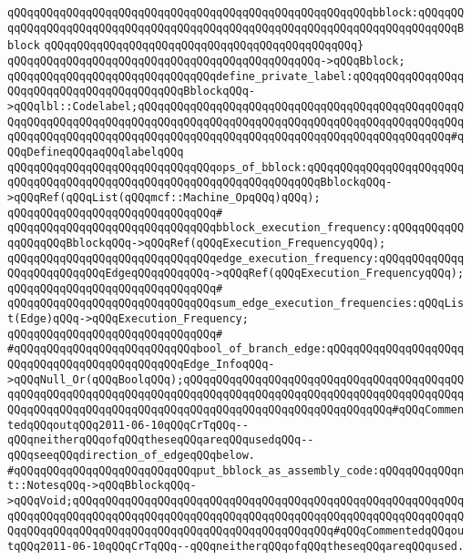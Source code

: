 \verb|qQQqqQQqqQQqqQQqqQQqqQQqqQQqqQQqqQQqqQQqqQQqqQQqqQQqqQQqbblock:qQQqqQQqqQQqqQQqqQQqqQQqqQQqqQQqqQQqqQQqqQQqqQQqqQQqqQQqqQQqqQQqqQQqqQQqqQQqBblock|\newline
\verb|qQQqqQQqqQQqqQQqqQQqqQQqqQQqqQQqqQQqqQQqqQQqqQQq}|\newline
\verb|qQQqqQQqqQQqqQQqqQQqqQQqqQQqqQQqqQQqqQQqqQQqqQQq->qQQqBblock;|\newline
\newline
\verb|qQQqqQQqqQQqqQQqqQQqqQQqqQQqqQQqdefine_private_label:qQQqqQQqqQQqqQQqqQQqqQQqqQQqqQQqqQQqqQQqqQQqBblockqQQq->qQQqlbl::Codelabel;qQQqqQQqqQQqqQQqqQQqqQQqqQQqqQQqqQQqqQQqqQQqqQQqqQQqqQQqqQQqqQQqqQQqqQQqqQQqqQQqqQQqqQQqqQQqqQQqqQQqqQQqqQQqqQQqqQQqqQQqqQQqqQQqqQQqqQQqqQQqqQQqqQQqqQQqqQQqqQQqqQQqqQQqqQQqqQQqqQQqqQQqqQQq#qQQqDefineqQQqaqQQqlabelqQQq|\newline
\verb|qQQqqQQqqQQqqQQqqQQqqQQqqQQqqQQqops_of_bblock:qQQqqQQqqQQqqQQqqQQqqQQqqQQqqQQqqQQqqQQqqQQqqQQqqQQqqQQqqQQqqQQqqQQqqQQqBblockqQQq->qQQqRef(qQQqList(qQQqmcf::Machine_OpqQQq)qQQq);|\newline
\verb|qQQqqQQqqQQqqQQqqQQqqQQqqQQqqQQq#|\newline
\verb|qQQqqQQqqQQqqQQqqQQqqQQqqQQqqQQqbblock_execution_frequency:qQQqqQQqqQQqqQQqqQQqBblockqQQq->qQQqRef(qQQqExecution_FrequencyqQQq);|\newline
\verb|qQQqqQQqqQQqqQQqqQQqqQQqqQQqqQQqedge_execution_frequency:qQQqqQQqqQQqqQQqqQQqqQQqqQQqEdgeqQQqqQQqqQQq->qQQqRef(qQQqExecution_FrequencyqQQq);|\newline
\verb|qQQqqQQqqQQqqQQqqQQqqQQqqQQqqQQq#|\newline
\verb|qQQqqQQqqQQqqQQqqQQqqQQqqQQqqQQqsum_edge_execution_frequencies:qQQqList(Edge)qQQq->qQQqExecution_Frequency;|\newline
\verb|qQQqqQQqqQQqqQQqqQQqqQQqqQQqqQQq#|\newline
\verb|#qQQqqQQqqQQqqQQqqQQqqQQqqQQqbool_of_branch_edge:qQQqqQQqqQQqqQQqqQQqqQQqqQQqqQQqqQQqqQQqqQQqqQQqEdge_InfoqQQq->qQQqNull_Or(qQQqBoolqQQq);qQQqqQQqqQQqqQQqqQQqqQQqqQQqqQQqqQQqqQQqqQQqqQQqqQQqqQQqqQQqqQQqqQQqqQQqqQQqqQQqqQQqqQQqqQQqqQQqqQQqqQQqqQQqqQQqqQQqqQQqqQQqqQQqqQQqqQQqqQQqqQQqqQQqqQQqqQQqqQQqqQQqqQQqqQQq#qQQqCommentedqQQqoutqQQq2011-06-10qQQqCrTqQQq--qQQqneitherqQQqofqQQqtheseqQQqareqQQqusedqQQq--qQQqseeqQQqdirection_of_edgeqQQqbelow.|\newline
\verb|#qQQqqQQqqQQqqQQqqQQqqQQqqQQqput_bblock_as_assembly_code:qQQqqQQqqQQqnt::NotesqQQq->qQQqBblockqQQq->qQQqVoid;qQQqqQQqqQQqqQQqqQQqqQQqqQQqqQQqqQQqqQQqqQQqqQQqqQQqqQQqqQQqqQQqqQQqqQQqqQQqqQQqqQQqqQQqqQQqqQQqqQQqqQQqqQQqqQQqqQQqqQQqqQQqqQQqqQQqqQQqqQQqqQQqqQQqqQQqqQQqqQQqqQQqqQQqqQQqqQQqqQQq#qQQqCommentedqQQqoutqQQq2011-06-10qQQqCrTqQQq--qQQqneitherqQQqofqQQqtheseqQQqareqQQqused.|\newline
